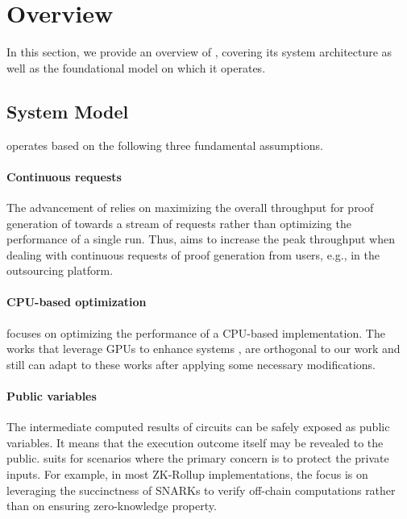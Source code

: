 \section{Overview}\label{sec:overview}
In this section, we provide an overview of \system, covering its system architecture as well as the foundational model on which it operates. 

\subsection{System Model}

\system operates based on the following three fundamental assumptions.

\paragraph{Continuous requests} The advancement of \system relies on maximizing the overall throughput for proof generation of \zk towards a stream of requests rather than optimizing the performance of a single run. Thus, \system aims to increase the peak throughput when dealing with continuous requests of proof generation from users, e.g., in the outsourcing platform. 

\paragraph{CPU-based optimization} \system focuses on optimizing the performance of a CPU-based  {\zk} implementation. The works that leverage GPUs to enhance \zk systems \cite{chen2017big,dai2016cuhe,goey2021accelerating,kim2020accelerating},  are orthogonal to our work and \system still can adapt to these works after applying some necessary modifications. 

\paragraph{Public variables} The intermediate computed results of circuits
can be safely exposed as public variables. It means that the execution outcome itself may be revealed to the public.  \system suits for scenarios where the primary concern is to protect the private inputs. 
For example, in most ZK-Rollup implementations, the focus is on leveraging the succinctness of SNARKs to verify off-chain computations rather than on ensuring zero-knowledge property.




